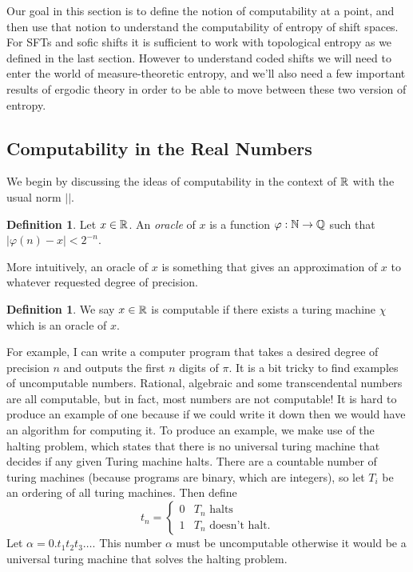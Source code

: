 \documentclass[11pt, reqno]{amsart}
\theoremstyle{plain}
\numberwithin{thm}{subsection}
\theoremstyle{definition}
\newtheorem{defn}[thm]{Definition}
\begin{document}
Our goal in this section is to define the notion of computability at a point, and then use that notion to understand the computability of entropy of shift spaces. For SFTs and sofic shifts it is sufficient to work with topological entropy as we defined in the last section. However to understand coded shifts we will need to enter the world of measure-theoretic entropy, and we'll also need a few important results of ergodic theory in order to be able to move between these two version of entropy.

\subsection{Computability in the Real Numbers}\cite[L6, L7]{wolf}   
We begin by discussing the ideas of computability in the context of $\mathbb{R}$ with the usual norm $||$. 
\begin{defn}
  Let $x \in \mathbb{R}$. An \textit{oracle} of $x$ is a function $\varphi: \mathbb{N} \rightarrow \mathbb{Q}$ such that $|\varphi(n) - x|< 2^{-n}$. 
\end{defn}
More intuitively, an oracle of $x$ is something that gives an approximation of $x$ to whatever requested degree of precision.
\begin{defn}
  We say $x \in \mathbb{R}$ is computable if there exists a turing machine $\chi$ which is an oracle of $x$. 
\end{defn}
For example, I can write a computer program that takes a desired degree of precision $n$ and outputs the first $n$ digits of $\pi$. It is a bit tricky to find examples of uncomputable numbers. Rational, algebraic and some transcendental numbers are all computable, but in fact, most numbers are not computable! It is hard to produce an example of one because if we could write it down then we would have an algorithm for computing it. To produce an example, we make use of the halting problem, which states that there is no universal turing machine that decides if any given Turing machine halts. There are a countable number of turing machines (because programs are binary, which are integers), so let $T_i$ be an ordering of all turing machines. Then define $$t_n = \begin{cases}
  0 & T_n \text{ halts} \\
  1 & T_n \text{ doesn't halt.}
\end{cases}$$ Let $\alpha = 0.t_1t_2t_3\dots$. This number $\alpha$ must be uncomputable otherwise it would be a universal turing machine that solves the halting problem. 
\end{document}
